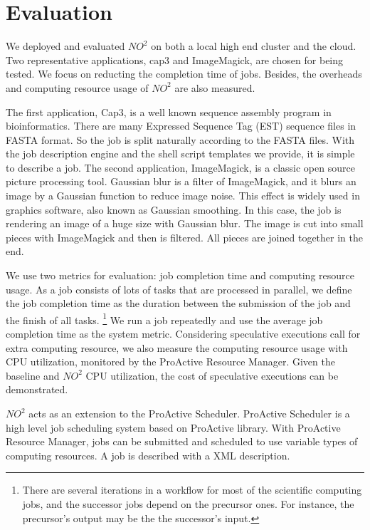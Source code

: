 \section{Evaluation} \label{sec-eval}

We deployed and evaluated $NO^2$ on both a local high end cluster and the cloud. Two
representative applications, cap3 and ImageMagick, are chosen for being tested. We focus on
reducting the completion time of jobs. Besides, the overheads and computing resource usage of $NO^2$ are also measured.

The first application, Cap3, is a well known sequence assembly program in bioinformatics. 
There are many Expressed Sequence Tag (EST) sequence files in
FASTA format. So the job is split naturally according to the FASTA files. With the job
description engine and the shell script templates we provide, it is
simple to describe a job. The second application, ImageMagick, is a classic open
source picture processing tool. Gaussian blur is a filter of ImageMagick, and it blurs an
image by a Gaussian function to reduce image noise. This effect is widely used in graphics
software, also known as Gaussian smoothing. In this case, the job is rendering an image of
a huge size with Gaussian blur. The image is cut into small pieces with ImageMagick and
then is filtered. All pieces are joined together in the end.

We use two metrics for evaluation: job completion time and computing resource usage. As a
job consists of lots of tasks that are processed in parallel, we define the job completion time
as the duration between the submission of the job and the finish of all tasks.
\footnote{ There are several iterations in a workflow for most of the scientific computing jobs, 
 and the successor jobs depend on the precursor ones. For instance, the
precursor's output may be the the successor's input.} We run a job repeatedly
and use the average job completion time as the system metric. Considering
speculative executions call for extra computing resource, we also measure the computing
resource usage with CPU utilization, monitored by the ProActive Resource Manager. Given
the baseline and $NO^2$ CPU utilization, the cost of speculative executions can be
demonstrated.

$NO^2$ acts as an extension to the ProActive Scheduler. ProActive Scheduler is a high
level job scheduling system based on ProActive library. With ProActive Resource Manager,
jobs can be submitted and scheduled to use variable types of computing resources. A job is
described with a XML description.

